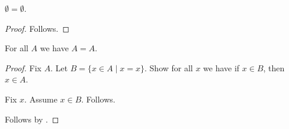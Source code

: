 \begin{proposition}\label{phase5_local_definition_irrelevant}
    $\emptyset=\emptyset$.
\end{proposition}
\begin{proof}
    Follows.
\end{proof}

\begin{proposition}\label{phase5_local_definition}
    For all $A$ we have $A = A$.
\end{proposition}
\begin{proof}
    Fix $A$.
    Let $B = \{x \in A \mid x = x\}$.
    Show for all $x$ we have if $x \in B$, then $x \in A$.
    \begin{subproof}
        Fix $x$.
        Assume $x \in B$.
        Follows.
    \end{subproof}
    Follows by \auto.
\end{proof}
